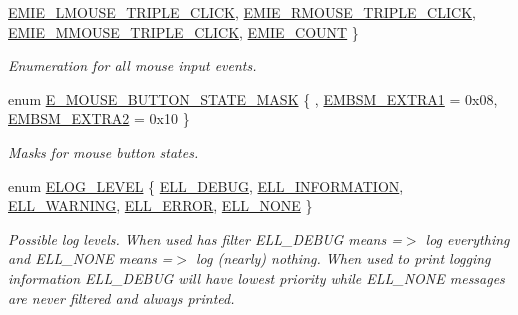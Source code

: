 \begin{DoxyCompactItemize}
\hyperlink{namespaceirr_a2dbf2a247aa17a9eeefbbf36ebd5739fa1145828528f7999720df3dd10a3a7de3}{E\+M\+I\+E\+\_\+\+L\+M\+O\+U\+S\+E\+\_\+\+T\+R\+I\+P\+L\+E\+\_\+\+C\+L\+I\+CK}, 
\newline
\hyperlink{namespaceirr_a2dbf2a247aa17a9eeefbbf36ebd5739fab24cbd2197b888022531799561c12b49}{E\+M\+I\+E\+\_\+\+R\+M\+O\+U\+S\+E\+\_\+\+T\+R\+I\+P\+L\+E\+\_\+\+C\+L\+I\+CK}, 
\hyperlink{namespaceirr_a2dbf2a247aa17a9eeefbbf36ebd5739fa72b90a632c6063a6f8e2fbf26187c9c6}{E\+M\+I\+E\+\_\+\+M\+M\+O\+U\+S\+E\+\_\+\+T\+R\+I\+P\+L\+E\+\_\+\+C\+L\+I\+CK}, 
\hyperlink{namespaceirr_a2dbf2a247aa17a9eeefbbf36ebd5739fa2cda06d009d09fc263752310cc64340f}{E\+M\+I\+E\+\_\+\+C\+O\+U\+NT}
 \}\begin{DoxyCompactList}\small\item\em Enumeration for all mouse input events. \end{DoxyCompactList}
\item 
enum \hyperlink{namespaceirr_a7057ec6fd3bba7cbbab3593c9e405a86}{E\+\_\+\+M\+O\+U\+S\+E\+\_\+\+B\+U\+T\+T\+O\+N\+\_\+\+S\+T\+A\+T\+E\+\_\+\+M\+A\+SK} \{ , \hyperlink{namespaceirr_a7057ec6fd3bba7cbbab3593c9e405a86ac0a92aabd6e6789f71b94f249f957f74}{E\+M\+B\+S\+M\+\_\+\+E\+X\+T\+R\+A1} = 0x08, 
\hyperlink{namespaceirr_a7057ec6fd3bba7cbbab3593c9e405a86ac560dffdf74df8ceebaedc79f1bb7c11}{E\+M\+B\+S\+M\+\_\+\+E\+X\+T\+R\+A2} = 0x10
 \}\begin{DoxyCompactList}\small\item\em Masks for mouse button states. \end{DoxyCompactList}
\item 
enum \hyperlink{namespaceirr_aa2d1cac68606a25ed24cfffccfa30a92}{E\+L\+O\+G\+\_\+\+L\+E\+V\+EL} \{ \newline
\hyperlink{namespaceirr_aa2d1cac68606a25ed24cfffccfa30a92a58d2a62ce004018e8bb6a29c732c70e3}{E\+L\+L\+\_\+\+D\+E\+B\+UG}, 
\hyperlink{namespaceirr_aa2d1cac68606a25ed24cfffccfa30a92a9d74de15737e326a91aec6f38c23f9cf}{E\+L\+L\+\_\+\+I\+N\+F\+O\+R\+M\+A\+T\+I\+ON}, 
\hyperlink{namespaceirr_aa2d1cac68606a25ed24cfffccfa30a92ad3d7f6bdd2f842cfc17561ba4be95001}{E\+L\+L\+\_\+\+W\+A\+R\+N\+I\+NG}, 
\hyperlink{namespaceirr_aa2d1cac68606a25ed24cfffccfa30a92a1c16e615e15fc3f75bacb50faaeb73ff}{E\+L\+L\+\_\+\+E\+R\+R\+OR}, 
\newline
\hyperlink{namespaceirr_aa2d1cac68606a25ed24cfffccfa30a92a558fe286a76cbba090c8301f7b1f7dcb}{E\+L\+L\+\_\+\+N\+O\+NE}
 \}\begin{DoxyCompactList}\small\item\em Possible log levels. When used has filter E\+L\+L\+\_\+\+D\+E\+B\+UG means =$>$ log everything and E\+L\+L\+\_\+\+N\+O\+NE means =$>$ log (nearly) nothing. When used to print logging information E\+L\+L\+\_\+\+D\+E\+B\+UG will have lowest priority while E\+L\+L\+\_\+\+N\+O\+NE messages are never filtered and always printed. \end{DoxyCompactList}

\end{DoxyCompactItemize}
